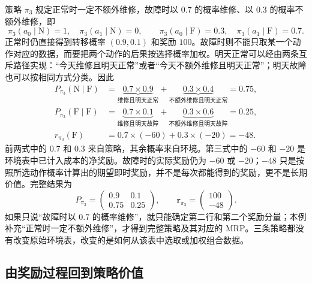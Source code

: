 \documentclass[UTF8,12pt,a4paper,fontset=fandol]{ctexart}
\begin{document}
\begin{example}
\label{ex:markov-three-policy-random}
策略 $\pi_3$ 规定正常时一定不额外维修，故障时以 $0.7$ 的概率维修、以 $0.3$ 的概率不额外维修，即
\[
  \pi_3(a_0\mid\mathrm N)=1,\quad
  \pi_3(a_1\mid\mathrm N)=0,\qquad
  \pi_3(a_0\mid\mathrm F)=0.3,\quad
  \pi_3(a_1\mid\mathrm F)=0.7.
\]
正常时仍直接得到转移概率 $(0.9,0.1)$ 和奖励 $100$。故障时则不能只取某一个动作对应的数据，而要把两个动作的后果按选择概率加权。明天正常可以经由两条互斥路径实现：“今天维修且明天正常”或者“今天不额外维修且明天正常”；明天故障也可以按相同方式分类。因此
\begin{equation}
  \begin{aligned}
    P_{\pi_3}(\mathrm N\mid\mathrm F)
      &=\underbrace{0.7\times0.9}_{\text{维修且明天正常}}
        +\underbrace{0.3\times0.4}_{\text{不额外维修且明天正常}}
        =0.75,\\
    P_{\pi_3}(\mathrm F\mid\mathrm F)
      &=\underbrace{0.7\times0.1}_{\text{维修且明天故障}}
        +\underbrace{0.3\times0.6}_{\text{不额外维修且明天故障}}
        =0.25,\\
    r_{\pi_3}(\mathrm F)
      &=0.7\times(-60)+0.3\times(-20)=-48.
  \end{aligned}
  \label{eq:markov-three-policy-random-mixture}
\end{equation}
前两式中的 $0.7$ 和 $0.3$ 来自策略，其余概率来自环境。第三式中的 $-60$ 和 $-20$ 是环境表中已计入成本的净奖励。故障时的实际奖励仍为 $-60$ 或 $-20$；$-48$ 只是按照所选动作概率计算出的期望即时奖励，并不是每次都能得到的奖励，更不是长期价值。完整结果为
\begin{equation}
  P_{\pi_3}=\begin{pmatrix}0.9&0.1\\0.75&0.25\end{pmatrix},
  \qquad
  \boldsymbol r_{\pi_3}=\begin{pmatrix}100\\-48\end{pmatrix}.
  \label{eq:markov-three-policy-random-mrp}
\end{equation}
如果只说“故障时以 $0.7$ 的概率维修”，就只能确定第二行和第二个奖励分量；本例补充“正常时一定不额外维修”，才得到完整策略及其对应的 MRP。三条策略都没有改变原始环境表，改变的是如何从该表中选取或加权组合数据。
\end{example}

\subsection{由奖励过程回到策略价值}
\end{document}
